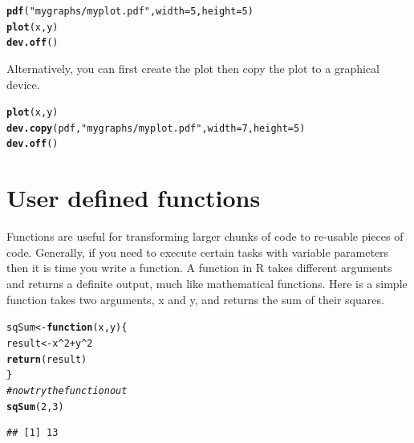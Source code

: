 \documentclass[english,nohyper]{tufte-book}\usepackage[]{graphicx}\usepackage[]{color}
\makeatletter
\newcommand{\hlnum}[1]{\textcolor[rgb]{0.686,0.059,0.569}{#1}}%
\newcommand{\hlstr}[1]{\textcolor[rgb]{0.192,0.494,0.8}{#1}}%
\newcommand{\hlcom}[1]{\textcolor[rgb]{0.678,0.584,0.686}{\textit{#1}}}%
\newcommand{\hlopt}[1]{\textcolor[rgb]{0,0,0}{#1}}%
\newcommand{\hlstd}[1]{\textcolor[rgb]{0.345,0.345,0.345}{#1}}%
\newcommand{\hlkwa}[1]{\textcolor[rgb]{0.161,0.373,0.58}{\textbf{#1}}}%
\newcommand{\hlkwb}[1]{\textcolor[rgb]{0.69,0.353,0.396}{#1}}%
\newcommand{\hlkwc}[1]{\textcolor[rgb]{0.333,0.667,0.333}{#1}}%
\newcommand{\hlkwd}[1]{\textcolor[rgb]{0.737,0.353,0.396}{\textbf{#1}}}%
\newenvironment{kframe}{%
 \def\at@end@of@kframe{}%
 \ifinner\ifhmode%
  \def\at@end@of@kframe{\end{minipage}}%
  \begin{minipage}{\columnwidth}%
 \fi\fi%
 \def\FrameCommand##1{\hskip\@totalleftmargin \hskip-\fboxsep
 \colorbox{shadecolor}{##1}\hskip-\fboxsep
     \hskip-\linewidth \hskip-\@totalleftmargin \hskip\columnwidth}%
 \MakeFramed {\advance\hsize-\width
   \@totalleftmargin\z@ \linewidth\hsize
   \@setminipage}}%
 {\par\unskip\endMakeFramed%
 \at@end@of@kframe}
\newenvironment{knitrout}{}{} %
\makeatother
\begin{document}
\begin{knitrout}
\color{fgcolor}\begin{kframe}
\begin{alltt}
\hlkwd{pdf}\hlstd{(}\hlstr{"mygraphs/myplot.pdf"}\hlstd{,} \hlkwc{width} \hlstd{=} \hlnum{5}\hlstd{,} \hlkwc{height} \hlstd{=} \hlnum{5}\hlstd{)}
\hlkwd{plot}\hlstd{(x, y)}
\hlkwd{dev.off}\hlstd{()}
\end{alltt}
\end{kframe}
\end{knitrout}


Alternatively, you can first create the plot then copy the plot to
a graphical device.

\begin{knitrout}
\color{fgcolor}\begin{kframe}
\begin{alltt}
\hlkwd{plot}\hlstd{(x, y)}
\hlkwd{dev.copy}\hlstd{(pdf,} \hlstr{"mygraphs/myplot.pdf"}\hlstd{,} \hlkwc{width} \hlstd{=} \hlnum{7}\hlstd{,} \hlkwc{height} \hlstd{=} \hlnum{5}\hlstd{)}
\hlkwd{dev.off}\hlstd{()}
\end{alltt}
\end{kframe}
\end{knitrout}



\section{User defined functions}

Functions are useful for transforming larger chunks of code to re-usable
pieces of code. Generally, if you need to execute certain tasks with
variable parameters then it is time you write a function. A function
in R takes different arguments and returns a definite output, much
like mathematical functions. Here is a simple function takes two arguments,
x and y, and returns the sum of their squares.

\begin{knitrout}
\color{fgcolor}\begin{kframe}
\begin{alltt}
\hlstd{sqSum} \hlkwb{<-} \hlkwa{function}\hlstd{(}\hlkwc{x}\hlstd{,} \hlkwc{y}\hlstd{) \{}
    \hlstd{result} \hlkwb{<-} \hlstd{x}\hlopt{^}\hlnum{2} \hlopt{+} \hlstd{y}\hlopt{^}\hlnum{2}
    \hlkwd{return}\hlstd{(result)}
\hlstd{\}}
\hlcom{# now try the function out}
\hlkwd{sqSum}\hlstd{(}\hlnum{2}\hlstd{,} \hlnum{3}\hlstd{)}
\end{alltt}
\begin{verbatim}
## [1] 13
\end{verbatim}
\end{kframe}
\end{knitrout}
\end{document}
